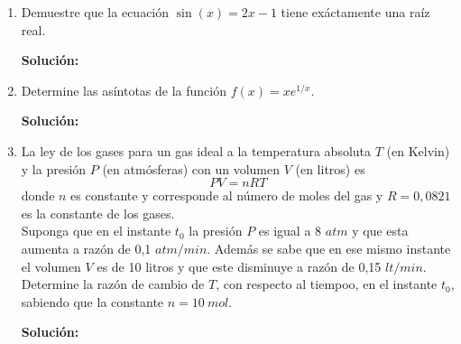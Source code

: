 \documentclass[12pt]{article}
\newenvironment{solucion}
{\begin{mdframed}[backgroundcolor=black!10]
		{\bf Solución:}\\
	}
	{
	\end{mdframed}
}
\newenvironment{preguntas}
{\begin{enumerate}\itemsep12pt
	}
	{
	\end{enumerate}
}
\begin{document}
\begin{preguntas}
\begin{solucion}
\end{solucion}
\item Demuestre que la ecuación $\sin (x) = 2x-1$ tiene exáctamente una raíz real.
\begin{solucion}

\end{solucion}
\item Determine las asíntotas de la función $f(x) = xe^{1/x}$.
\begin{solucion}

\end{solucion}
\item La ley de los gases para un gas ideal a la temperatura absoluta $T$ (en Kelvin) y la presión $P$ (en atmósferas) con un volumen $V$ (en litros) es
$$PV = nRT$$
donde $n$ es constante y corresponde al número de moles del gas y $R = 0,0821$ es la constante de los gases.\\
Suponga que en el instante $t_0$ la presión $P$ es igual a 8 $atm$ y que esta aumenta a razón de 0,1 $atm/min$. Además se sabe que en ese mismo instante el volumen $V$ es de 10 litros y que este disminuye a razón de 0,15 $lt/min$.\\
Determine la razón de cambio de $T$, con respecto al tiempoo, en el instante $t_0$, sabiendo que la constante $n = 10\ mol$.
\begin{solucion}

\end{solucion}
\end{preguntas}
\end{document}
